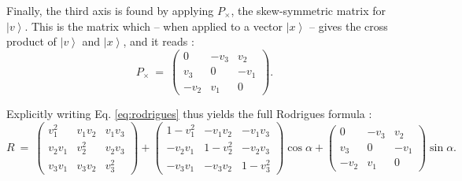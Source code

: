 Finally, the third axis is found by applying $P_{\times}$, the skew-symmetric matrix for $\left|v\right>$.
This is the matrix which -- when applied to a vector $\left|x\right>$ -- gives the cross product of $\left|v\right>$ and $\left|x\right>$, 
and it reads \cite{wiki_skewsymm}:
\begin{equation}
	P_{\times} \ =\ 
		\left( \begin{array}{ccc} 
			0     & -v_3 &  v_2 \\
			v_3   & 0    & -v_1 \\
			-v_2  & v_1  & 0
		\end{array} \right).
\end{equation}

Explicitly writing Eq. \ref{eq:rodrigues} thus yields the full Rodrigues formula \cite[p. 718, p. 816]{Arens2015}:
\begin{equation}
	R \ = \ 
		\left( \begin{array}{ccc} 
			v_1^2   &    v_1 v_2 &       v_1 v_3 \\
			v_2 v_1 &      v_2^2 &       v_2 v_3 \\
			v_3 v_1 &    v_3 v_2 &         v_3^2
		\end{array} \right)
	+ 	\left( \begin{array}{ccc} 
			1 - v_1^2    &      - v_1 v_2 &         - v_1 v_3 \\
			   - v_2 v_1 &      1 - v_2^2 &         - v_2 v_3 \\
			   - v_3 v_1 &      - v_3 v_2 &         1 - v_3^2
		\end{array} \right)
		\cos \alpha 
	 + 
		\left( \begin{array}{ccc} 
			0     & -v_3 &  v_2 \\
			v_3   & 0    & -v_1 \\
			-v_2  & v_1  & 0
		\end{array} \right)
		\sin \alpha.
	\label{eq:rodrigues_expl}
\end{equation}


